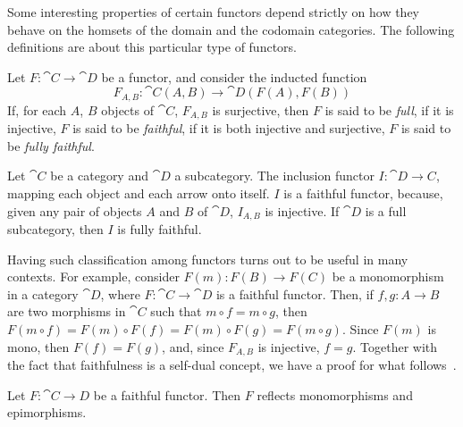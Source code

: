 Some interesting properties of certain functors depend strictly on how they behave on the homsets of the domain and the codomain categories. The following definitions are about this particular type of functors.

\begin{definition}
    Let $F: \cat C \rightarrow \cat D$ be a functor, and consider the inducted function
    $$
        F_{A, B} : {\cat C}(A, B) \rightarrow {\cat D}(F(A), F(B))
    $$
    If, for each $A$, $B$ objects of $\cat C$, $F_{A, B}$ is surjective, then $F$ is said to be \emph{full}, if it is injective, $F$ is said to be \emph{faithful}, if it is both injective and surjective, $F$ is said to be \emph{fully faithful}.
\end{definition}

\color{black}
    

\begin{example}\label{ex:full_subc_inc_fully_faith}
    Let $\cat C$ be a category and $\cat D$ a subcategory. The inclusion functor $I: \cat{D \rightarrow C}$, mapping each object and each arrow onto itself. $I$ is a faithful functor, because, given any pair of objects $A$ and $B$ of $\cat D$, $I_{A, B}$ is injective. If $\cat D$ is a full subcategory, then $I$ is fully faithful.
\end{example}

Having such classification among functors turns out to be useful in many contexts. For example, consider $F(m): F(B) \rightarrow F(C)$ be a monomorphism in a category $\cat D$, where $F: \cat C \rightarrow \cat D$ is a faithful functor. Then, if $f, g: A \rightarrow B$ are two morphisms in $\cat C$ such that $m \circ f = m \circ g$, then $F(m \circ f) = F(m) \circ F(f) = F(m) \circ F(g) = F(m\circ g)$. Since $F(m)$ is mono, then $F(f) = F(g)$, and, since $F_{A, B}$ is injective, $f = g$. Together with the fact that faithfulness is a self-dual concept, we have a proof for what follows~\cite{Herrlich_Strecker_1979}.

\begin{prop}
    Let $F: \cat{C \rightarrow D}$ be a faithful functor. Then $F$ reflects monomorphisms and epimorphisms.
\end{prop}


